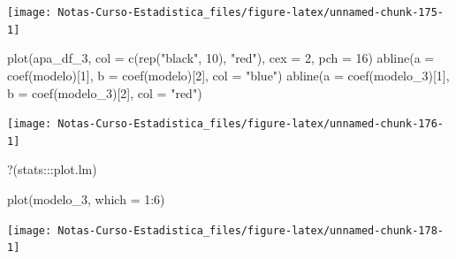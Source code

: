 \documentclass[
  12pt,
]{book}
\newenvironment{Shaded}{\begin{snugshade}}{\end{snugshade}}
\newcommand{\AttributeTok}[1]{\textcolor[rgb]{0.77,0.63,0.00}{#1}}
\newcommand{\DecValTok}[1]{\textcolor[rgb]{0.00,0.00,0.81}{#1}}
\newcommand{\FunctionTok}[1]{\textcolor[rgb]{0.00,0.00,0.00}{#1}}
\newcommand{\NormalTok}[1]{#1}
\newcommand{\SpecialCharTok}[1]{\textcolor[rgb]{0.00,0.00,0.00}{#1}}
\newcommand{\StringTok}[1]{\textcolor[rgb]{0.31,0.60,0.02}{#1}}
\theoremstyle{definition}
\theoremstyle{definition}
\theoremstyle{definition}
\theoremstyle{definition}
\theoremstyle{remark}
\begin{document}
\begin{center}\texttt{[image: Notas-Curso-Estadistica\_files/figure-latex/unnamed-chunk-175-1]} \end{center}

\begin{Shaded}
\begin{Highlighting}[]
\FunctionTok{plot}\NormalTok{(apa\_df\_3, }\AttributeTok{col =} \FunctionTok{c}\NormalTok{(}\FunctionTok{rep}\NormalTok{(}\StringTok{"black"}\NormalTok{, }\DecValTok{10}\NormalTok{), }\StringTok{"red"}\NormalTok{), }\AttributeTok{cex =} \DecValTok{2}\NormalTok{,}
    \AttributeTok{pch =} \DecValTok{16}\NormalTok{)}
\FunctionTok{abline}\NormalTok{(}\AttributeTok{a =} \FunctionTok{coef}\NormalTok{(modelo)[}\DecValTok{1}\NormalTok{], }\AttributeTok{b =} \FunctionTok{coef}\NormalTok{(modelo)[}\DecValTok{2}\NormalTok{], }\AttributeTok{col =} \StringTok{"blue"}\NormalTok{)}
\FunctionTok{abline}\NormalTok{(}\AttributeTok{a =} \FunctionTok{coef}\NormalTok{(modelo\_3)[}\DecValTok{1}\NormalTok{], }\AttributeTok{b =} \FunctionTok{coef}\NormalTok{(modelo\_3)[}\DecValTok{2}\NormalTok{],}
    \AttributeTok{col =} \StringTok{"red"}\NormalTok{)}
\end{Highlighting}
\end{Shaded}

\begin{center}\texttt{[image: Notas-Curso-Estadistica\_files/figure-latex/unnamed-chunk-176-1]} \end{center}

\begin{Shaded}
\begin{Highlighting}[]
\StringTok{\textasciigrave{}}\AttributeTok{?}\StringTok{\textasciigrave{}}\NormalTok{(stats}\SpecialCharTok{:::}\NormalTok{plot.lm)}
\end{Highlighting}
\end{Shaded}

\begin{Shaded}
\begin{Highlighting}[]
\FunctionTok{plot}\NormalTok{(modelo\_3, }\AttributeTok{which =} \DecValTok{1}\SpecialCharTok{:}\DecValTok{6}\NormalTok{)}
\end{Highlighting}
\end{Shaded}

\begin{center}\texttt{[image: Notas-Curso-Estadistica\_files/figure-latex/unnamed-chunk-178-1]} \end{center}
\end{document}
